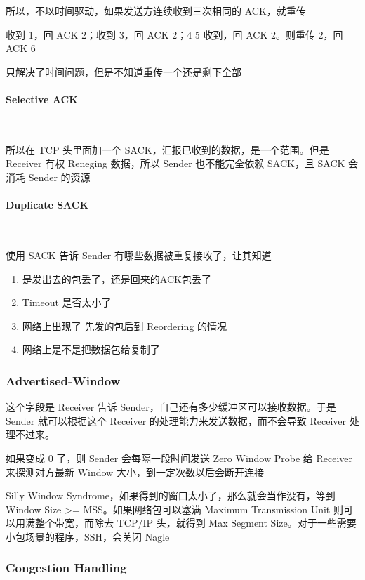 \documentclass[11pt,journal,compsoc]{IEEEtran}
\begin{document}
所以，不以时间驱动，如果发送方连续收到三次相同的 ACK，就重传

收到 1，回 ACK 2；收到 3，回 ACK 2；4 5 收到，回 ACK 2。则重传 2，回 ACK 6

只解决了时间问题，但是不知道重传一个还是剩下全部

\paragraph{Selective ACK} ~

所以在 TCP 头里面加一个 SACK，汇报已收到的数据，是一个范围。但是 Receiver 有权 Reneging 数据，所以 Sender 也不能完全依赖 SACK，且 SACK 会消耗 Sender 的资源

\paragraph{Duplicate SACK} ~

使用 SACK 告诉 Sender 有哪些数据被重复接收了，让其知道

\begin{enumerate}
    \item 是发出去的包丢了，还是回来的ACK包丢了

    \item Timeout 是否太小了

    \item 网络上出现了 先发的包后到 Reordering 的情况

    \item 网络上是不是把数据包给复制了
\end{enumerate}


\subsubsection{Advertised-Window}

这个字段是 Receiver 告诉 Sender，自己还有多少缓冲区可以接收数据。于是 Sender 就可以根据这个 Receiver 的处理能力来发送数据，而不会导致 Receiver 处理不过来。

如果变成 0 了，则 Sender 会每隔一段时间发送 Zero Window Probe 给 Receiver 来探测对方最新 Window 大小，到一定次数以后会断开连接

Silly Window Syndrome，如果得到的窗口太小了，那么就会当作没有，等到 Window Size >= MSS。如果网络包可以塞满 Maximum Transmission Unit 则可以用满整个带宽，而除去 TCP/IP 头，就得到 Max Segment Size。对于一些需要小包场景的程序，SSH，会关闭 Nagle


\subsubsection{Congestion Handling}
\end{document}
